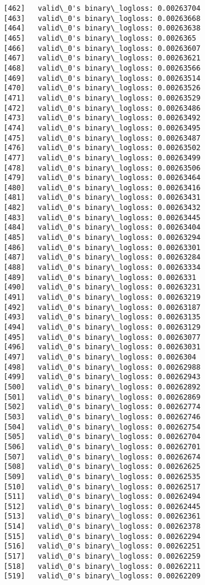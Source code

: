 \documentclass[11pt]{article}
\begin{document}
\begin{Verbatim}[commandchars=\\\{\}]
[462]	valid\_0's binary\_logloss: 0.00263704
[463]	valid\_0's binary\_logloss: 0.00263668
[464]	valid\_0's binary\_logloss: 0.00263638
[465]	valid\_0's binary\_logloss: 0.0026365
[466]	valid\_0's binary\_logloss: 0.00263607
[467]	valid\_0's binary\_logloss: 0.00263621
[468]	valid\_0's binary\_logloss: 0.00263566
[469]	valid\_0's binary\_logloss: 0.00263514
[470]	valid\_0's binary\_logloss: 0.00263526
[471]	valid\_0's binary\_logloss: 0.00263529
[472]	valid\_0's binary\_logloss: 0.00263486
[473]	valid\_0's binary\_logloss: 0.00263492
[474]	valid\_0's binary\_logloss: 0.00263495
[475]	valid\_0's binary\_logloss: 0.00263487
[476]	valid\_0's binary\_logloss: 0.00263502
[477]	valid\_0's binary\_logloss: 0.00263499
[478]	valid\_0's binary\_logloss: 0.00263506
[479]	valid\_0's binary\_logloss: 0.00263464
[480]	valid\_0's binary\_logloss: 0.00263416
[481]	valid\_0's binary\_logloss: 0.00263431
[482]	valid\_0's binary\_logloss: 0.00263432
[483]	valid\_0's binary\_logloss: 0.00263445
[484]	valid\_0's binary\_logloss: 0.00263404
[485]	valid\_0's binary\_logloss: 0.00263294
[486]	valid\_0's binary\_logloss: 0.00263301
[487]	valid\_0's binary\_logloss: 0.00263284
[488]	valid\_0's binary\_logloss: 0.00263334
[489]	valid\_0's binary\_logloss: 0.0026331
[490]	valid\_0's binary\_logloss: 0.00263231
[491]	valid\_0's binary\_logloss: 0.00263219
[492]	valid\_0's binary\_logloss: 0.00263187
[493]	valid\_0's binary\_logloss: 0.00263135
[494]	valid\_0's binary\_logloss: 0.00263129
[495]	valid\_0's binary\_logloss: 0.00263077
[496]	valid\_0's binary\_logloss: 0.00263031
[497]	valid\_0's binary\_logloss: 0.0026304
[498]	valid\_0's binary\_logloss: 0.00262988
[499]	valid\_0's binary\_logloss: 0.00262943
[500]	valid\_0's binary\_logloss: 0.00262892
[501]	valid\_0's binary\_logloss: 0.00262869
[502]	valid\_0's binary\_logloss: 0.00262774
[503]	valid\_0's binary\_logloss: 0.00262746
[504]	valid\_0's binary\_logloss: 0.00262754
[505]	valid\_0's binary\_logloss: 0.00262704
[506]	valid\_0's binary\_logloss: 0.00262701
[507]	valid\_0's binary\_logloss: 0.00262674
[508]	valid\_0's binary\_logloss: 0.00262625
[509]	valid\_0's binary\_logloss: 0.00262535
[510]	valid\_0's binary\_logloss: 0.00262517
[511]	valid\_0's binary\_logloss: 0.00262494
[512]	valid\_0's binary\_logloss: 0.00262445
[513]	valid\_0's binary\_logloss: 0.00262361
[514]	valid\_0's binary\_logloss: 0.00262378
[515]	valid\_0's binary\_logloss: 0.00262294
[516]	valid\_0's binary\_logloss: 0.00262251
[517]	valid\_0's binary\_logloss: 0.00262259
[518]	valid\_0's binary\_logloss: 0.00262211
[519]	valid\_0's binary\_logloss: 0.00262209

\end{Verbatim}
\end{document}
